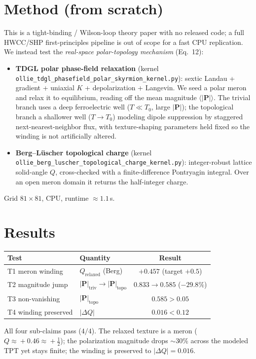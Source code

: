 \documentclass[11pt]{article}
\begin{document}
\section{Method (from scratch)}
This is a tight-binding / Wilson-loop theory paper with no released code; a full
HWCC/SHP first-principles pipeline is out of scope for a fast CPU replication.
We instead test the \emph{real-space polar-topology mechanism} (Eq.~12):
\begin{itemize}
\item \textbf{TDGL polar phase-field relaxation} (kernel
\texttt{ollie\_tdgl\_phasefield\_polar\_skyrmion\_kernel.py}): sextic Landau +
gradient + uniaxial $K$ + depolarization + Langevin. We seed a polar meron and
relax it to equilibrium, reading off the mean magnitude $\langle|\mathbf P|\rangle$.
The trivial branch uses a deep ferroelectric well ($T\!\ll\!T_0$, large $|\mathbf P|$);
the topological branch a shallower well ($T\!\to\!T_0$) modeling dipole suppression
by staggered next-nearest-neighbor flux, with texture-shaping parameters held fixed
so the winding is not artificially altered.
\item \textbf{Berg--Lüscher topological charge} (kernel
\texttt{ollie\_berg\_luscher\_topological\_charge\_kernel.py}): integer-robust
lattice solid-angle $Q$, cross-checked with a finite-difference Pontryagin integral.
Over an open meron domain it returns the half-integer charge.
\end{itemize}
Grid $81\times81$, CPU, runtime $\approx1.1$\,s.

\section{Results}
\begin{center}
\begin{tabular}{llc}
\toprule
Test & Quantity & Result \\
\midrule
T1 meron winding & $Q_\text{relaxed}$ (Berg) & $+0.457$ (target $+0.5$) \\
T2 magnitude jump & $|\mathbf P|_\text{triv}\!\to\!|\mathbf P|_\text{topo}$ & $0.833\to0.585$ ($-29.8\%$) \\
T3 non-vanishing & $|\mathbf P|_\text{topo}$ & $0.585>0.05$ \\
T4 winding preserved & $|\Delta Q|$ & $0.016<0.12$ \\
\bottomrule
\end{tabular}
\end{center}
All four sub-claims pass ($4/4$). The relaxed texture is a meron
($Q\!\approx\!+0.46\!\approx\!+\tfrac12$); the polarization magnitude drops
$\sim\!30\%$ across the modeled TPT yet stays finite; the winding is preserved to
$|\Delta Q|=0.016$.
\end{document}
